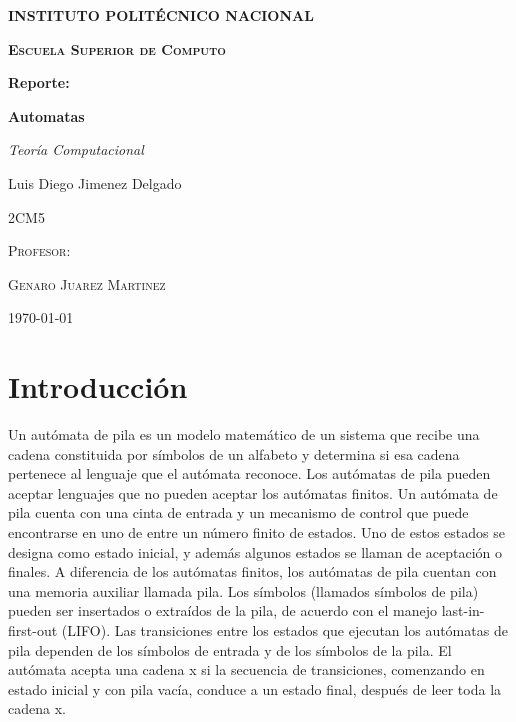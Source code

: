 \documentclass[11pt,a4paper]{report}
\begin{document}
	\begin{titlepage}
		\centering
		{\scshape\huge\bfseries INSTITUTO POLITÉCNICO NACIONAL \par}
		\vspace{0.7cm}
		{\scshape\LARGE\bfseries Escuela Superior de Computo \par}
		\vspace{0.5cm}
		{\scshape\Large \par}
		\vspace{1.5cm}
		{\Large\bfseries Reporte: \par}
		{\huge\bfseries Automatas \par}
		\vspace{2cm}
		{\LARGE\itshape Teoría Computacional\par}
		\vspace{0.2cm}
		{\Large Luis Diego Jimenez Delgado\par}
		\vfill
			{\scshape\Large 2CM5 \par}
			\vspace{0.5cm}
			{\scshape\large Profesor: \par}
			{\scshape\Large Genaro Juarez Martinez \par}
		\vfill
		{\large \today}
	\end{titlepage}
 
	\tableofcontents{}
	\chapter{Introducción}
Un autómata de pila es un modelo matemático de un sistema que recibe una cadena constituida por símbolos de un alfabeto y determina si esa cadena pertenece al lenguaje que el autómata reconoce.
Los autómatas de pila pueden aceptar lenguajes que no pueden aceptar los autómatas finitos. Un autómata de pila cuenta con una cinta de entrada y un mecanismo de control que puede encontrarse en uno de entre un número finito de estados. Uno de estos estados se designa como estado inicial, y además algunos estados se llaman de aceptación o finales. A diferencia de los autómatas finitos, los autómatas de pila cuentan con una memoria auxiliar llamada pila. Los símbolos (llamados símbolos de pila) pueden ser insertados o extraídos de la pila, de acuerdo con el manejo last-in-first-out (LIFO).
Las transiciones entre los estados que ejecutan los autómatas de pila dependen de los símbolos de entrada y de los símbolos de la pila. El autómata acepta una cadena x si la secuencia de transiciones, comenzando en estado inicial y con pila vacía, conduce a un estado final, después de leer toda la cadena x.
\end{document}

